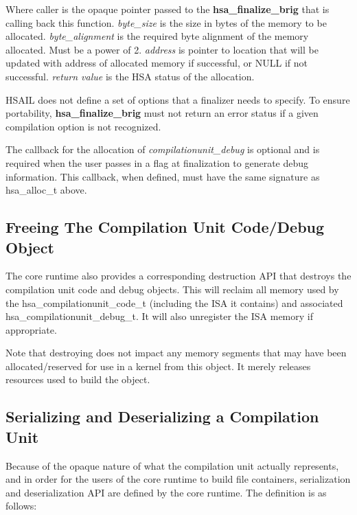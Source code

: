 \documentclass[draft]{book}
\newcommand{\hsaarg}[1]{\textit{#1}}
\newcommand{\reffun}[1]{\textbf{#1}}
\newcommand{\reftyp}[1]{#1}
\begin{document}
\begin{appendices}
Where caller is the opaque pointer passed to the \reffun{hsa_finalize_brig}
that is calling back this function. {\itshape byte_size} is the size in bytes
of the memory to be allocated. {\itshape byte_alignment} is the required byte
alignment of the memory allocated. Must be a power of 2. {\itshape address} is
pointer to location that will be updated with address of allocated memory if
successful, or NULL if not successful. {\itshape return value} is the HSA
status of the allocation.



HSAIL does not define a set of options that a finalizer needs to specify. To
ensure portability, \reffun{hsa_finalize_brig} must not return an error status
if a given compilation option is not recognized.

The callback for the allocation of \hsaarg{compilationunit_debug} is optional
and is required when the user passes in a flag at finalization to generate debug
information. This callback, when defined, must have the same signature as
\reftyp{hsa_alloc_t} above.




\subsection{Freeing The Compilation Unit Code/Debug Object}
The core runtime also provides a corresponding destruction API that destroys the
compilation unit code and debug objects. This will reclaim all memory used by
the \reftyp{hsa_compilationunit_code_t} (including the ISA it contains) and
associated \reftyp{hsa_compilationunit_debug_t}. It will also unregister the
ISA memory if appropriate.



Note that destroying does not impact any memory segments that may have been
allocated/reserved for use in a kernel from this object. It merely releases
resources used to build the object.

\subsection{Serializing and Deserializing a Compilation Unit}

Because of the opaque nature of what the compilation unit actually represents,
and in order for the users of the core runtime to build file containers,
serialization and deserialization API are defined by the core runtime. The
definition is as follows:


\end{appendices}
\end{document}
